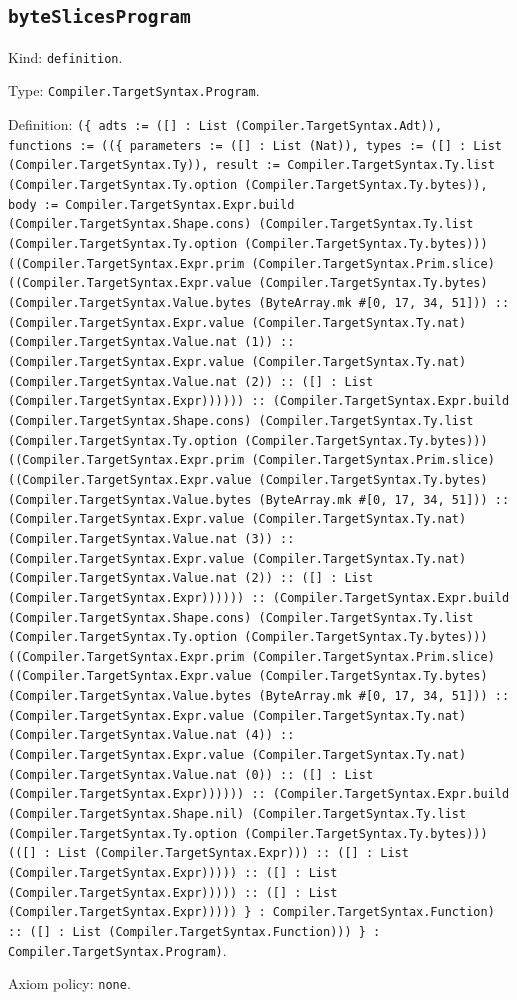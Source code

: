 \documentclass[11pt]{article}
\begin{document}
\subsection*{\texttt{byteSlicesProgram}}
\noindent Kind: \texttt{definition}.\par
\noindent Type: \texttt{Compiler.TargetSyntax.Program}.\par
\noindent Definition: \texttt{(\{ adts := ([] : List (Compiler.TargetSyntax.Adt)), functions := ((\{ parameters := ([] : List (Nat)), types := ([] : List (Compiler.TargetSyntax.Ty)), result := Compiler.TargetSyntax.Ty.list (Compiler.TargetSyntax.Ty.option (Compiler.TargetSyntax.Ty.bytes)), body := Compiler.TargetSyntax.Expr.build (Compiler.TargetSyntax.Shape.cons) (Compiler.TargetSyntax.Ty.list (Compiler.TargetSyntax.Ty.option (Compiler.TargetSyntax.Ty.bytes))) ((Compiler.TargetSyntax.Expr.prim (Compiler.TargetSyntax.Prim.slice) ((Compiler.TargetSyntax.Expr.value (Compiler.TargetSyntax.Ty.bytes) (Compiler.TargetSyntax.Value.bytes (ByteArray.mk \#[0, 17, 34, 51])) :: (Compiler.TargetSyntax.Expr.value (Compiler.TargetSyntax.Ty.nat) (Compiler.TargetSyntax.Value.nat (1)) :: (Compiler.TargetSyntax.Expr.value (Compiler.TargetSyntax.Ty.nat) (Compiler.TargetSyntax.Value.nat (2)) :: ([] : List (Compiler.TargetSyntax.Expr)))))) :: (Compiler.TargetSyntax.Expr.build (Compiler.TargetSyntax.Shape.cons) (Compiler.TargetSyntax.Ty.list (Compiler.TargetSyntax.Ty.option (Compiler.TargetSyntax.Ty.bytes))) ((Compiler.TargetSyntax.Expr.prim (Compiler.TargetSyntax.Prim.slice) ((Compiler.TargetSyntax.Expr.value (Compiler.TargetSyntax.Ty.bytes) (Compiler.TargetSyntax.Value.bytes (ByteArray.mk \#[0, 17, 34, 51])) :: (Compiler.TargetSyntax.Expr.value (Compiler.TargetSyntax.Ty.nat) (Compiler.TargetSyntax.Value.nat (3)) :: (Compiler.TargetSyntax.Expr.value (Compiler.TargetSyntax.Ty.nat) (Compiler.TargetSyntax.Value.nat (2)) :: ([] : List (Compiler.TargetSyntax.Expr)))))) :: (Compiler.TargetSyntax.Expr.build (Compiler.TargetSyntax.Shape.cons) (Compiler.TargetSyntax.Ty.list (Compiler.TargetSyntax.Ty.option (Compiler.TargetSyntax.Ty.bytes))) ((Compiler.TargetSyntax.Expr.prim (Compiler.TargetSyntax.Prim.slice) ((Compiler.TargetSyntax.Expr.value (Compiler.TargetSyntax.Ty.bytes) (Compiler.TargetSyntax.Value.bytes (ByteArray.mk \#[0, 17, 34, 51])) :: (Compiler.TargetSyntax.Expr.value (Compiler.TargetSyntax.Ty.nat) (Compiler.TargetSyntax.Value.nat (4)) :: (Compiler.TargetSyntax.Expr.value (Compiler.TargetSyntax.Ty.nat) (Compiler.TargetSyntax.Value.nat (0)) :: ([] : List (Compiler.TargetSyntax.Expr)))))) :: (Compiler.TargetSyntax.Expr.build (Compiler.TargetSyntax.Shape.nil) (Compiler.TargetSyntax.Ty.list (Compiler.TargetSyntax.Ty.option (Compiler.TargetSyntax.Ty.bytes))) (([] : List (Compiler.TargetSyntax.Expr))) :: ([] : List (Compiler.TargetSyntax.Expr))))) :: ([] : List (Compiler.TargetSyntax.Expr))))) :: ([] : List (Compiler.TargetSyntax.Expr))))) \} : Compiler.TargetSyntax.Function) :: ([] : List (Compiler.TargetSyntax.Function))) \} : Compiler.TargetSyntax.Program)}.\par
\noindent Axiom policy: \texttt{none}.\par
\end{document}
